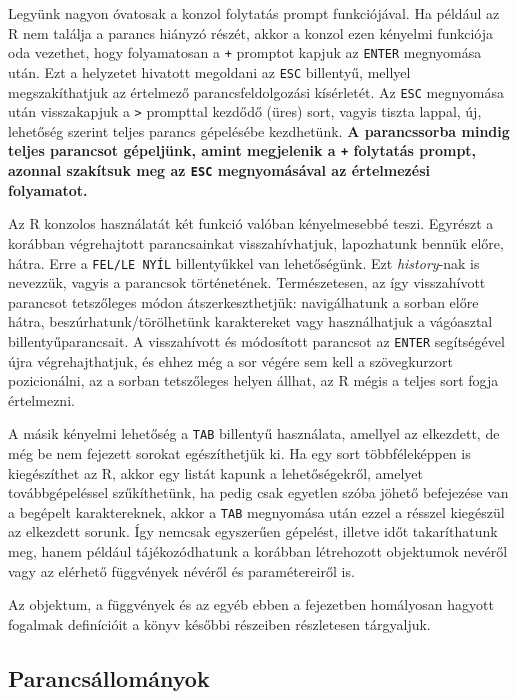 \documentclass[
]{book}
\begin{document}
Legyünk nagyon óvatosak a konzol folytatás prompt funkciójával. Ha például az R nem találja a parancs hiányzó részét, akkor a konzol ezen kényelmi funkciója oda vezethet, hogy folyamatosan a \texttt{+} promptot kapjuk az \texttt{ENTER} megnyomása után. Ezt a helyzetet hivatott megoldani az \texttt{ESC} billentyű, mellyel megszakíthatjuk az értelmező parancsfeldolgozási kísérletét. Az \texttt{ESC} megnyomása után visszakapjuk a \texttt{\textgreater{}} prompttal kezdődő (üres) sort, vagyis tiszta lappal, új, lehetőség szerint teljes parancs gépelésébe kezdhetünk. \textbf{A parancssorba mindig teljes parancsot gépeljünk, amint megjelenik a \texttt{+} folytatás prompt, azonnal szakítsuk meg az \texttt{ESC} megnyomásával az értelmezési folyamatot.}

Az R konzolos használatát két funkció valóban kényelmesebbé teszi. Egyrészt a korábban végrehajtott parancsainkat visszahívhatjuk, lapozhatunk bennük előre, hátra. Erre a \texttt{FEL/LE\ NYÍL} billentyűkkel van lehetőségünk. Ezt \emph{history}-nak is nevezzük, vagyis a parancsok történetének. Természetesen, az így visszahívott parancsot tetszőleges módon átszerkeszthetjük: navigálhatunk a sorban előre hátra, beszúrhatunk/törölhetünk karaktereket vagy használhatjuk a vágóasztal billentyűparancsait. A visszahívott és módosított parancsot az \texttt{ENTER} segítségével újra végrehajthatjuk, és ehhez még a sor végére sem kell a szövegkurzort pozicionálni, az a sorban tetszőleges helyen állhat, az R mégis a teljes sort fogja értelmezni.

A másik kényelmi lehetőség a \texttt{TAB} billentyű használata, amellyel az elkezdett, de még be nem fejezett sorokat egészíthetjük ki. Ha egy sort többféleképpen is kiegészíthet az R, akkor egy listát kapunk a lehetőségekről, amelyet továbbgépeléssel szűkíthetünk, ha pedig csak egyetlen szóba jöhető befejezése van a begépelt karaktereknek, akkor a \texttt{TAB} megnyomása után ezzel a résszel kiegészül az elkezdett sorunk. Így nemcsak egyszerűen gépelést, illetve időt takaríthatunk meg, hanem például tájékozódhatunk a korábban létrehozott objektumok nevéről vagy az elérhető függvények névéről és paramétereiről is.

Az objektum, a függvények és az egyéb ebben a fejezetben homályosan hagyott fogalmak definícióit a könyv későbbi részeiben részletesen tárgyaljuk.

\hypertarget{parancsallomanyok}{%
\subsection{Parancsállományok}\label{parancsallomanyok}}
\end{document}
